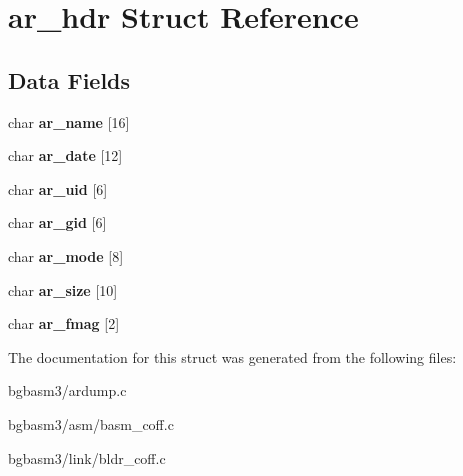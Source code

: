 \hypertarget{structar__hdr}{\section{ar\-\_\-hdr Struct Reference}
\label{structar__hdr}
}
\subsection*{Data Fields}
\begin{DoxyCompactItemize}
\item 
\hypertarget{structar__hdr_a77a6694111aeaa71dd8dbad5193670c6}{char {\bfseries ar\-\_\-name} \mbox{[}16\mbox{]}}\label{structar__hdr_a77a6694111aeaa71dd8dbad5193670c6}

\item 
\hypertarget{structar__hdr_a07de4482a1c3f7fe8d0d15949b5575ce}{char {\bfseries ar\-\_\-date} \mbox{[}12\mbox{]}}\label{structar__hdr_a07de4482a1c3f7fe8d0d15949b5575ce}

\item 
\hypertarget{structar__hdr_aedfb7c330480319f8998781ce0266c83}{char {\bfseries ar\-\_\-uid} \mbox{[}6\mbox{]}}\label{structar__hdr_aedfb7c330480319f8998781ce0266c83}

\item 
\hypertarget{structar__hdr_a1d3e8bc8ae8ac7a1ed03ae871da77faa}{char {\bfseries ar\-\_\-gid} \mbox{[}6\mbox{]}}\label{structar__hdr_a1d3e8bc8ae8ac7a1ed03ae871da77faa}

\item 
\hypertarget{structar__hdr_a66fcdd3b2ad541514ed49e8e61ea255e}{char {\bfseries ar\-\_\-mode} \mbox{[}8\mbox{]}}\label{structar__hdr_a66fcdd3b2ad541514ed49e8e61ea255e}

\item 
\hypertarget{structar__hdr_a09f6dbdc8b61c643b858572f2199c4e7}{char {\bfseries ar\-\_\-size} \mbox{[}10\mbox{]}}\label{structar__hdr_a09f6dbdc8b61c643b858572f2199c4e7}

\item 
\hypertarget{structar__hdr_ad352325090924d5471539404338d6359}{char {\bfseries ar\-\_\-fmag} \mbox{[}2\mbox{]}}\label{structar__hdr_ad352325090924d5471539404338d6359}

\end{DoxyCompactItemize}


The documentation for this struct was generated from the following files\-:\begin{DoxyCompactItemize}
\item 
bgbasm3/ardump.\-c\item 
bgbasm3/asm/basm\-\_\-coff.\-c\item 
bgbasm3/link/bldr\-\_\-coff.\-c\end{DoxyCompactItemize}
